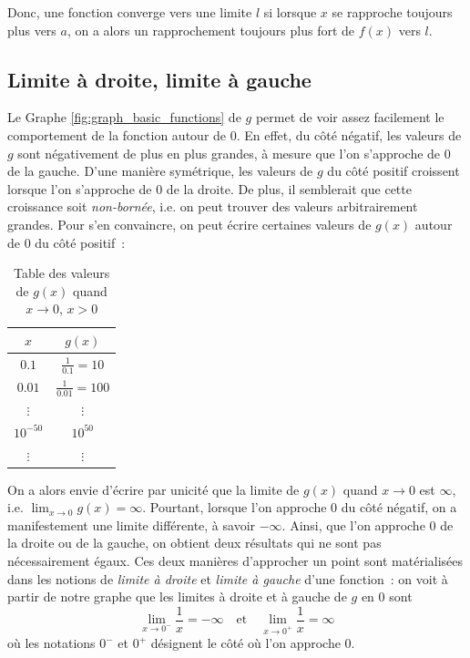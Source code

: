 Donc, une fonction converge vers une limite $l$ si lorsque $x$ se rapproche toujours plus vers $a$, on a alors un rapprochement toujours plus fort de $f(x)$ vers $l$.




\subsection{Limite à droite, limite à gauche}
Le Graphe \ref{fig:graph_basic_functions} de $g$ permet de voir assez facilement le comportement de la fonction autour de $0$. En effet, du côté négatif, les valeurs de $g$ sont négativement de plus en plus grandes, à mesure que l'on s'approche de 0 de la gauche. D'une manière symétrique, les valeurs de $g$ du côté positif croissent lorsque l'on s'approche de 0 de la droite. De plus, il semblerait que cette croissance soit \emph{non-bornée}, i.e. on peut trouver des valeurs arbitrairement grandes. Pour s'en convaincre, on peut écrire certaines valeurs de $g(x)$ autour de 0 du côté positif~:
\begin{table}[H]
    \centering
    \begin{tabular}{|c|c|}
        \hline
        $x$ & $g(x)$ \\
        \hline
        $0.1$ & $\frac{1}{0.1} = 10$ \\
        \hline
        $0.01$ & $\frac{1}{0.01} = 100$ \\
        \hline
        $\vdots$ & $\vdots$ \\
        \hline
        $10^{-50}$ & $10^{50}$ \\
        \hline
        $\vdots$ & $\vdots$ \\
        \hline
    \end{tabular}
    \caption{Table des valeurs de $g(x)$ quand $x \to 0$, $x > 0$}
    \label{tab:singularity_values}
\end{table}
On a alors envie d'écrire par unicité que la limite de $g(x)$ quand $x \to 0$ est $\infty$, i.e. $\displaystyle\lim_{x \to 0} g(x) = \infty$. Pourtant, lorsque l'on approche 0 du côté négatif, on a manifestement une limite différente, à savoir $-\infty$. Ainsi, que l'on approche $0$ de la droite ou de la gauche, on obtient deux résultats qui ne sont pas nécessairement égaux. Ces deux manières d'approcher un point sont matérialisées dans les notions de \emph{limite à droite} et \emph{limite à gauche} d'une fonction~: on voit à partir de notre graphe que les limites à droite et à gauche de $g$ en $0$ sont
\begin{equation}
\lim_{x \to 0^{-}} \frac{1}{x} = -\infty \quad \mathrm{ et } \quad \lim_{x \to 0^{+}} \frac{1}{x} = \infty
\end{equation}
où les notations $0^{-}$ et $0^{+}$ désignent le côté où l'on approche $0$.


